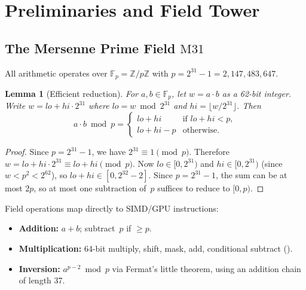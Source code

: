 \documentclass[10pt,twocolumn]{article}
\newtheorem{lemma}[theorem]{Lemma}
\theoremstyle{definition}
\theoremstyle{remark}
\newcommand{\Fp}{\mathbb{F}_p}
\newcommand{\M}{\mathrm{M31}}
\begin{document}
\section{Preliminaries and Field Tower}\label{sec:prelim}

\subsection{The Mersenne Prime Field \texorpdfstring{$\M$}{M31}}

All arithmetic operates over $\Fp = \mathbb{Z}/p\mathbb{Z}$ with
$p = 2^{31}-1 = 2{,}147{,}483{,}647$.

\begin{lemma}[Efficient reduction]\label{lem:reduction}
  For $a,b \in \Fp$, let $w = a \cdot b$ as a 62-bit integer.
  Write $w = \mathit{lo} + \mathit{hi} \cdot 2^{31}$ where
  $\mathit{lo} = w \bmod 2^{31}$ and
  $\mathit{hi} = \lfloor w/2^{31}\rfloor$.
  Then
  \begin{equation}\label{eq:m31-reduce}
    a \cdot b \bmod p =
    \begin{cases}
      \mathit{lo} + \mathit{hi} & \text{if } \mathit{lo}+\mathit{hi} < p,\\
      \mathit{lo} + \mathit{hi} - p & \text{otherwise.}
    \end{cases}
  \end{equation}
\end{lemma}

\begin{proof}
  Since $p = 2^{31}-1$, we have $2^{31} \equiv 1 \pmod{p}$.
  Therefore $w = \mathit{lo} + \mathit{hi}\cdot 2^{31}
  \equiv \mathit{lo} + \mathit{hi} \pmod{p}$.
  Now $\mathit{lo} \in [0, 2^{31})$ and
  $\mathit{hi} \in [0, 2^{31})$ (since $w < p^2 < 2^{62}$),
  so $\mathit{lo}+\mathit{hi} \in [0, 2^{32}-2]$.
  Since $p = 2^{31}-1$, the sum can be at most $2p$, so at most
  one subtraction of~$p$ suffices to reduce to $[0,p)$.
\end{proof}

Field operations map directly to SIMD/GPU instructions:
\begin{itemize}[nosep,leftmargin=1.2em]
  \item \textbf{Addition:} $a+b$; subtract~$p$ if $\ge p$.
  \item \textbf{Multiplication:} 64-bit multiply, shift, mask, add,
        conditional subtract ().
  \item \textbf{Inversion:} $a^{p-2}\bmod p$ via Fermat's little theorem,
        using an addition chain of length 37.
\end{itemize}
\end{document}
